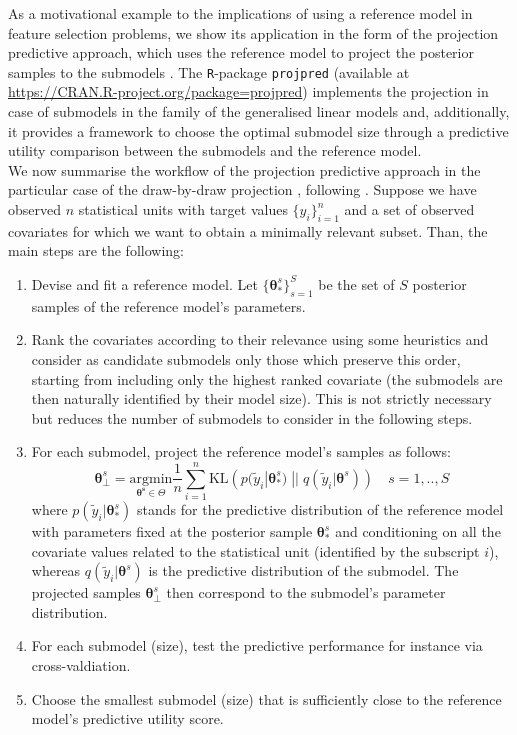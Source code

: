 \documentclass[american,]{article}
\theoremstyle{definition}
\begin{document}
As a motivational example to the implications of using a reference model in feature selection problems, we show its application in the form of the projection predictive approach, which uses the reference model to project the posterior samples to the submodels \citep{paper:original_proj}. The \texttt{R}-package \texttt{projpred} (available at \url{https://CRAN.R-project.org/package=projpred}) implements the projection in case of submodels in the family of the generalised linear models and, additionally, it provides a framework to choose the optimal submodel size through a predictive utility comparison between the submodels and the reference model. 
\\
We now summarise the workflow of the projection predictive approach in the particular case of the draw-by-draw projection \cite[original formulation by][]{paper:original_proj}, following \cite{paper:projpred}. Suppose we have observed $n$ statistical units with target values $\{y_{i}\}_{i=1}^{n}$ and a set of observed covariates for which we want to obtain a minimally relevant subset. Than, the main steps are the following:
\begin{enumerate}
\item Devise and fit a reference model. Let $\{\boldsymbol{\theta}_{*}^{s}\}_{s=1}^{S}$ be the set of $S$ posterior samples of the reference model's parameters.
\item Rank the covariates according to their relevance using some heuristics and consider as candidate submodels only those which preserve this order,  starting from including only the highest ranked covariate (the submodels are then naturally identified by their model size). This is not strictly necessary but reduces the number of submodels to consider in the following steps.
\item For each submodel, project the reference model's samples as follows:
\begin{equation}\label{eq:draw_by_draw}
\boldsymbol{\theta}_{\perp}^{s} = \underset{\boldsymbol{\theta^{s}}\in\Theta}{\text{argmin}} \frac{1}{n}\sum_{i=1}^{n}\text{KL} \left( p(\tilde{y}_{i}|\boldsymbol{\theta}_{*}^{s})\;||\;q(\tilde{y}_{i}|\boldsymbol{\theta}^{s}) \right) \quad s=1,..,S
\end{equation}
where $p(\tilde{y}_{i}|\boldsymbol{\theta}_{*}^{s})$ stands for the predictive distribution of the reference model with parameters fixed at the posterior sample $\boldsymbol{\theta}_{*}^{s}$ and conditioning on all the covariate values related to the statistical unit (identified by the subscript $i$), whereas $q(\tilde{y}_{i}|\boldsymbol{\theta}^{s})$ is the predictive distribution of the submodel. The projected samples $\boldsymbol{\theta}_{\perp}^{s}$ then correspond to the submodel's parameter distribution.
\item For each submodel (size), test the predictive performance for instance via cross-valdiation.
\item Choose the smallest submodel (size) that is sufficiently close to the reference model's predictive utility score.
\end{enumerate} 
\end{document}
